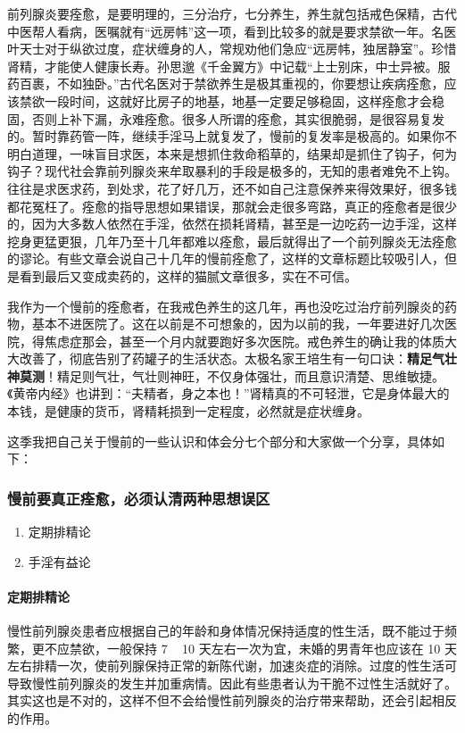 前列腺炎要痊愈，是要明理的，三分治疗，七分养生，养生就包括戒色保精，古代中医帮人看病，医嘱就有“远房帏”这一项，看到比较多的就是要求禁欲一年。名医叶天士对于纵欲过度，症状缠身的人，常规劝他们急应“远房帏，独居静室”。珍惜肾精，才能使人健康长寿。孙思邈《千金翼方》中记载“上士别床，中士异被。服药百裹，不如独卧。”古代名医对于禁欲养生是极其重视的，你要想让疾病痊愈，应该禁欲一段时间，这就好比房子的地基，地基一定要足够稳固，这样痊愈才会稳固，否则上补下漏，永难痊愈。很多人所谓的痊愈，其实很脆弱，是很容易复发的。暂时靠药管一阵，继续手淫马上就复发了，慢前的复发率是极高的。如果你不明白道理，一味盲目求医，本来是想抓住救命稻草的，结果却是抓住了钩子，何为钩子？现代社会靠前列腺炎来牟取暴利的手段是极多的，无知的患者难免不上钩。往往是求医求药，到处求，花了好几万，还不如自己注意保养来得效果好，很多钱都花冤枉了。痊愈的指导思想如果错误，那就会走很多弯路，真正的痊愈者是很少的，因为大多数人依然在手淫，依然在损耗肾精，甚至是一边吃药一边手淫，这样挖身更猛更狠，几年乃至十几年都难以痊愈，最后就得出了一个前列腺炎无法痊愈的谬论。有些文章会说自己十几年的慢前痊愈了，这样的文章标题比较吸引人，但是看到最后又变成卖药的，这样的猫腻文章很多，实在不可信。

我作为一个慢前的痊愈者，在我戒色养生的这几年，再也没吃过治疗前列腺炎的药物，基本不进医院了。这在以前是不可想象的，因为以前的我，一年要进好几次医院，得焦虑症那会，甚至一个月内就要跑好多次医院。戒色养生的确让我的体质大大改善了，彻底告别了药罐子的生活状态。太极名家王培生有一句口诀：\textbf{精足气壮神莫测}！精足则气壮，气壮则神旺，不仅身体强壮，而且意识清楚、思维敏捷。《黄帝内经》也讲到：“夫精者，身之本也！”肾精真的不可轻泄，它是身体最大的本钱，是健康的货币，肾精耗损到一定程度，必然就是症状缠身。

这季我把自己关于慢前的一些认识和体会分七个部分和大家做一个分享，具体如下：

\subsubsection{慢前要真正痊愈，必须认清两种思想误区}

\begin{multicols}{2}
    \begin{enumerate}
        \item 定期排精论
        \item 手淫有益论
    \end{enumerate}
\end{multicols}

\paragraph{定期排精论} 慢性前列腺炎患者应根据自己的年龄和身体情况保持适度的性生活，既不能过于频繁，更不应禁欲，一般保持 7 ~ 10 天左右一次为宜，未婚的男青年也应该在 10 天左右排精一次，使前列腺保持正常的新陈代谢，加速炎症的消除。过度的性生活可导致慢性前列腺炎的发生并加重病情。因此有些患者认为干脆不过性生活就好了。其实这也是不对的，这样不但不会给慢性前列腺炎的治疗带来帮助，还会引起相反的作用。

